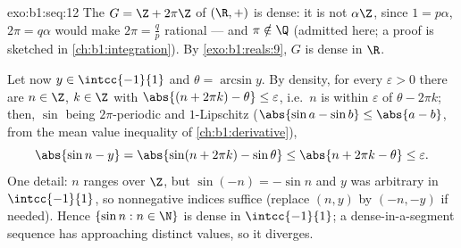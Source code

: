 \begin{solution}{exo:b1:seq:12}
The  $G = \Z + 2\pi\Z$ of $(\R, +)$ is dense: it is not
$\alpha\Z$, since $1 = p\alpha$, $2\pi = q\alpha$ would make $2\pi =
\frac qp$ rational --- and $\pi \notin \Q$ (admitted here; a proof is
sketched in \cref{ch:b1:integration}). By \cref{exo:b1:reals:9}, $G$
is dense in $\R$.

Let now $y \in \intcc{-1}{1}$ and $\theta = \arcsin y$. By density,
for every $\varepsilon > 0$ there are $n \in \Z$, $k \in \Z$ with
$\abs{(n + 2\pi k) - \theta} \leq \varepsilon$, i.e.\ $n$ is within
$\varepsilon$ of $\theta - 2\pi k$; then, $\sin$ being
$2\pi$-periodic and $1$-Lipschitz ($\abs{\sin a - \sin b} \leq
\abs{a - b}$, from the mean value inequality of
\cref{ch:b1:derivative}),
\[
\abs{\sin n - y} = \abs{\sin(n + 2\pi k) - \sin\theta}
\leq \abs{n + 2\pi k - \theta} \leq \varepsilon .
\]
One detail: $n$ ranges over $\Z$, but $\sin(-n) = -\sin n$ and $y$
was arbitrary in $\intcc{-1}{1}$, so nonnegative indices suffice
(replace $(n, y)$ by $(-n, -y)$ if needed). Hence $\{\sin n : n \in
\N\}$ is dense in $\intcc{-1}{1}$; a dense-in-a-segment sequence has
 approaching distinct values, so it diverges.
\end{solution}

